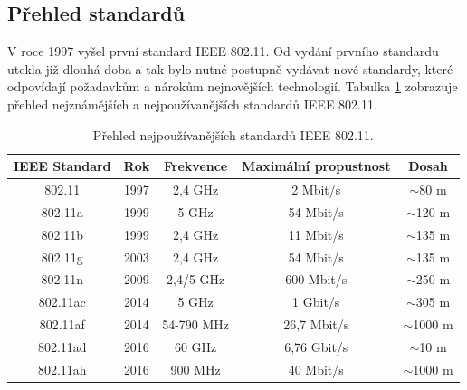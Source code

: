 \subsection{Přehled standardů}
V roce 1997 vyšel první standard IEEE 802.11. Od vydání prvního standardu utekla již dlouhá doba a tak bylo nutné postupně vydávat nové standardy, které odpovídají požadavkům a nárokům nejnovějších technologií. Tabulka \ref{table:standardy} zobrazuje přehled nejznámějších a nejpoužívanějších standardů IEEE 802.11.

\begin{table}[htb]
\centering
\begin{tabular}{|c|c|c|c|c|}
\hline
\textbf{IEEE Standard} & \textbf{Rok} & \textbf{Frekvence} & \textbf{Maximální propustnost} &\textbf{Dosah} \\ \hline
802.11                 & 1997         & 2,4 GHz            & 2 Mbit/s                       & $\sim$80 m     \\ \hline
802.11a                & 1999         & 5 GHz              & 54 Mbit/s                      & $\sim$120 m     \\ \hline
802.11b                & 1999         & 2,4 GHz              & 11 Mbit/s                      & $\sim$135 m     \\ \hline
802.11g                & 2003         & 2,4 GHz              & 54 Mbit/s                      & $\sim$135 m     \\ \hline
802.11n                & 2009         & 2,4/5 GHz              & 600 Mbit/s                      & $\sim$250 m     \\ \hline
802.11ac            & 2014         & 5 GHz              & 1 Gbit/s                      & $\sim$305 m     \\ \hline
802.11af            & 2014         & 54-790 MHz              & 26,7 Mbit/s                      & $\sim$1000 m     \\ \hline
802.11ad            & 2016         & 60 GHz              & 6,76 Gbit/s                      & $\sim$10 m     \\ \hline
802.11ah            & 2016         & 900 MHz              & 40 Mbit/s                      & $\sim$1000 m     \\ \hline
\end{tabular}
\caption{Přehled nejpoužívanějších standardů IEEE 802.11.}
\label{table:standardy}
\end{table}


